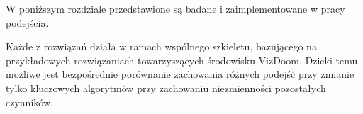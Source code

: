 W poniższym rozdziale przedstawione są badane i zaimplementowane w pracy podejścia.

Każde z rozwiązań działa w ramach wspólnego szkieletu, bazującego na przykładowych rozwiązaniach towarzyszących środowisku VizDoom. Dzieki temu możliwe jest bezpośrednie porównanie zachowania różnych podejść przy zmianie tylko kluczowych algorytmów przy zachowaniu niezmienności pozostałych czynników.
